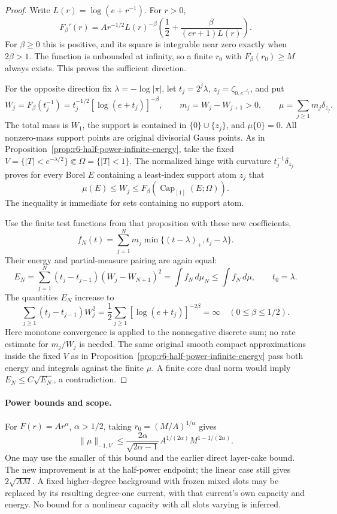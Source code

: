 \documentclass[11pt,a4paper]{article}
\numberwithin{equation}{section}
\theoremstyle{definition}
\theoremstyle{remark}
\begin{document}
\begin{proof}
Write $L(r)=\log(e+r^{-1})$. For $r>0$,
\[
 F_\beta'(r)
    = A r^{-1/2}L(r)^{-\beta}
           \left(\frac12+\frac{\beta}{(er+1)L(r)}\right).
\]
For $\beta\ge0$ this is positive, and its square is integrable near
zero exactly when $2\beta>1$. The function is unbounded at infinity,
so a finite $r_0$ with $F_\beta(r_0)\ge M$ always exists. This proves
the sufficient direction.

For the opposite direction fix $\lambda=-\log|\pi|$, let
$t_j=2^j\lambda$, $z_j=\zeta_{0,e^{-t_j}}$, and put
\[
 W_j=F_\beta(t_j^{-1})
       =t_j^{-1/2}[\log(e+t_j)]^{-\beta},\qquad
 m_j=W_j-W_{j+1}>0,\qquad
 \mu=\sum_{j\ge1}m_j\delta_{z_j}.
\]
The total mass is $W_1$, the support is contained in
$\{0\}\cup\{z_j\}$, and $\mu\{0\}=0$. All nonzero-mass support
points are original divisorial Gauss points. As in
Proposition~\ref{prop:r6-half-power-infinite-energy}, take the fixed
$V=\{|T|<e^{-\lambda/2}\}\Subset\Omega=\{|T|<1\}$.
The normalized hinge with curvature $t_j^{-1}\delta_{z_j}$ proves
for every Borel $E$ containing a least-index support atom $z_j$ that
\[
        \mu(E)\le W_j
             \le F_\beta(\operatorname{Cap}_{[1]}(E;\Omega)).
\]
The inequality is immediate for sets containing no support atom.

Use the finite test functions from that proposition with these new
coefficients,
\[
          f_N(t)=\sum_{j=1}^N m_j
                           \min\{(t-\lambda)_+,t_j-\lambda\}.
\]
Their energy and partial-measure pairing are again equal:
\[
 E_N=\sum_{j=1}^N(t_j-t_{j-1})
                            (W_j-W_{N+1})^2
        =\int f_N\,d\mu_N\le\int f_N\,d\mu,
          \qquad t_0=\lambda.
\]
The quantities $E_N$ increase to
\[
 \sum_{j\ge1}(t_j-t_{j-1})W_j^2
       =\frac12\sum_{j\ge1}[\log(e+t_j)]^{-2\beta}=\infty
                                     \quad(0\le\beta\le1/2).
\]
Here monotone convergence is applied to the nonnegative discrete
sum; no rate estimate for $m_j/W_j$ is needed. The same original
smooth compact approximations inside the fixed $V$ as in
Proposition~\ref{prop:r6-half-power-infinite-energy} pass both energy
and integrals against the finite $\mu$. A finite core dual norm
would imply $E_N\le C\sqrt{E_N}$, a contradiction.
\end{proof}

\paragraph{Power bounds and scope.}
For $F(r)=Ar^\alpha$, $\alpha>1/2$, taking
$r_0=(M/A)^{1/\alpha}$ gives
\[
 \|\mu\|_{-1,V}
   \le\frac{2\alpha}{\sqrt{2\alpha-1}}
                  A^{1/(2\alpha)}M^{1-1/(2\alpha)}.
\]
One may use the smaller of this bound and the earlier direct
layer-cake bound. The new improvement is at the half-power endpoint;
the linear case still gives $2\sqrt{AM}$. A fixed higher-degree
background with frozen mixed slots may be replaced by its resulting
degree-one current, with that current's own capacity and energy.
No bound for a nonlinear capacity with all slots varying is inferred.
\end{document}
